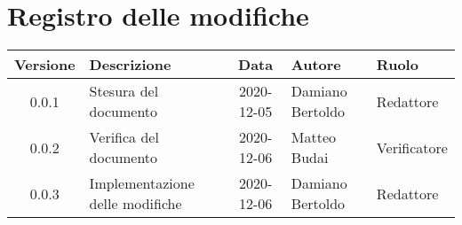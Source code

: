 \section*{Registro delle modifiche}

\begin{center}
	\begin{longtable}{|c|p{3.5cm}|c|p{3.1cm}|p{3cm}|}
	\hline
	\rowcolor{lighter-grayer}
	\textbf{Versione} & \textbf{Descrizione} & \textbf{Data} & \textbf{Autore} & \textbf{Ruolo} \\
	\hline
	\endfirsthead

	0.0.1 & Stesura del documento & 2020-12-05 & Damiano Bertoldo & Redattore \\
	\hline
	0.0.2 & Verifica del documento & 2020-12-06 & Matteo Budai & Verificatore \\
	\hline
	0.0.3 & Implementazione delle modifiche & 2020-12-06 & Damiano Bertoldo & Redattore \\
	\hline

	\end{longtable}
\end{center}
